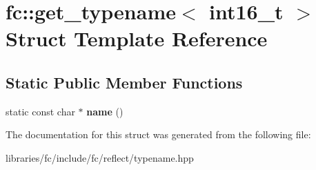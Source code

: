 \hypertarget{structfc_1_1get__typename_3_01int16__t_01_4}{}\section{fc\+:\+:get\+\_\+typename$<$ int16\+\_\+t $>$ Struct Template Reference}
\label{structfc_1_1get__typename_3_01int16__t_01_4}
\subsection*{Static Public Member Functions}
\begin{DoxyCompactItemize}
\item 
\mbox{\label{structfc_1_1get__typename_3_01int16__t_01_4_aacacd30fd1e6ffe86356eb597b82fcf8}} 
static const char $\ast$ {\bfseries name} ()
\end{DoxyCompactItemize}


The documentation for this struct was generated from the following file\+:\begin{DoxyCompactItemize}
\item 
libraries/fc/include/fc/reflect/typename.\+hpp\end{DoxyCompactItemize}
